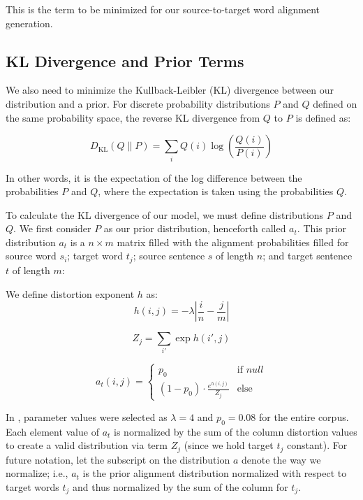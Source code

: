 \documentclass[twoside,twocolumn]{article}
\newlength\mystoreparindent
\newenvironment{myparindent}[1]{%
  \setlength{\mystoreparindent}{\the\parindent}
  \setlength{\parindent}{#1}
  }{%
  \setlength{\parindent}{\mystoreparindent}
}
\begin{document}
\begin{myparindent}{0pt}
This is the term to be minimized for our source-to-target word alignment
generation.


\subsection{KL Divergence and Prior Terms}

We also need to minimize the Kullback-Leibler (KL) divergence between our
distribution and a prior. For discrete probability distributions $P$ and $Q$
defined on the same probability space, the reverse KL divergence from $Q$ to
$P$ is defined as:

\begin{equation}
D_{\mathrm{KL}}(Q \| P) = \sum_{i} Q(i) \log \left( \frac{Q(i)}{P(i)} \right)
\end{equation}

In other words, it is the expectation of the log difference between the
probabilities $P$ and $Q$, where the expectation is taken using the
probabilities $Q$.

To calculate the KL divergence of our model, we must define
distributions $P$ and $Q$. We first consider $P$ as our prior
distribution, henceforth called $a_t$. This prior distribution $a_t$ is a
$n \times m$ matrix filled with the alignment probabilities filled for source
word $s_i$; target word $t_j$; source sentence $s$ of length $n$; and target
sentence $t$ of length $m$:

We define distortion exponent $h$ as:
\begin{equation}
  h(i, j) = {-\lambda \left| \frac{i}{n} - \frac{j}{m}\right|}
\end{equation}

\begin{equation}
  Z_j = \sum_{i'} \exp h(i', j)
\end{equation}

\begin{equation}
a_t (i, j) =
\begin{cases}
      p_0 & \text{if } null \\
     (1-p_0) \cdot \frac{e^{h(i,j)}}{Z_j} & \text{else}
   \end{cases}
\end{equation}

In \cite{dyer2013simple}, parameter values were selected as
$\lambda = 4$ and $p_0 = 0.08$ for the entire corpus.
Each element value of $a_t$ is normalized by the sum of the column distortion
values to create a valid distribution via term $Z_j$
(since we hold target $t_j$ constant). For future notation, let the subscript
on the distribution $a$ denote the way we normalize; i.e., $a_t$ is the
prior alignment distribution normalized with respect to target
words $t_j$ and thus normalized by the sum of the column for $t_j$.


\end{myparindent}
\end{document}

